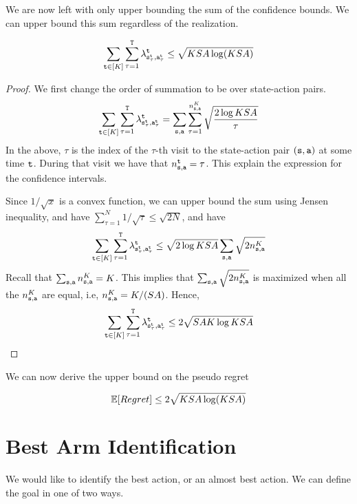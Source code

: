 We are now left with only upper bounding the sum of the confidence bounds.
We can upper bound this sum regardless of the realization. 

\begin{lemma}
    \[
    \sum_{{\tt t}\in [K]} \sum_{\tau=1}^{\tt T}
\lambda^{\tt t}_{{\tt s}_\tau^{\tt t},{\tt a}_\tau^{\tt t}}
    \leq \sqrt{KSA\log (KSA)}
    \]
\end{lemma}

\begin{proof}
    We first change the order of summation to be over state-action pairs.
    \[
    \sum_{{\tt t}\in [K]} \sum_{\tau=1}^{\tt T}
\lambda^{\tt t}_{{\tt s}_\tau^{\tt t},{\tt a}_\tau^{\tt t}} =
\sum_{{\tt s},{\tt a}} \sum_{\tau=1}^{n_{{\tt s},{\tt a}}^K}
\sqrt{\frac{2\log KSA}{\tau}}
    \]
In the above, $\tau$ is the index of the $\tau$-th visit to the state-action pair $({\tt s},{\tt a})$ at some time ${\tt t}$. During that visit we have that  $n_{{\tt s},{\tt a}}^{\tt t}=\tau$.
This explain the expression for the confidence intervals.

Since $1/\sqrt{x}$ is a convex function, we can upper bound the sum using Jensen inequality, and have $\sum_{\tau=1}^N 1/\sqrt{\tau}\leq \sqrt{2N}$, and have
    \[
    \sum_{{\tt t}\in [K]} \sum_{\tau=1}^{\tt T}
\lambda^{\tt t}_{{\tt s}_\tau^{\tt t},{\tt a}_\tau^{\tt t}} \leq
\sqrt{2\log KSA}
\sum_{{\tt s},{\tt a}}
\sqrt{2 n_{{\tt s},{\tt a}}^K}
    \]
Recall that $\sum_{{\tt s},{\tt a}} n_{{\tt s},{\tt a}}^K =K$. This implies that $\sum_{{\tt s},{\tt a}}
\sqrt{2 n_{{\tt s},{\tt a}}^K}$ is maximized when all the $n_{{\tt s},{\tt a}}^K$ are equal, i.e, $n_{{\tt s},{\tt a}}^K=K/(SA)$. Hence,
    \[
    \sum_{{\tt t}\in [K]} \sum_{\tau=1}^{\tt T}
\lambda^{\tt t}_{{\tt s}_\tau^{\tt t},{\tt a}_\tau^{\tt t}} \leq
2
\sqrt{SAK\log KSA}
    \]
\end{proof}

We can now derive the upper bound on the pseudo regret
\begin{theorem}
    \[
    \mathbb{E}[Regret] \leq 2\sqrt{KSA\log (KSA)}
    \]
\end{theorem}

\section{Best Arm Identification}

We would like to identify the best action, or an almost best action.
We can define the goal in one of two ways.

